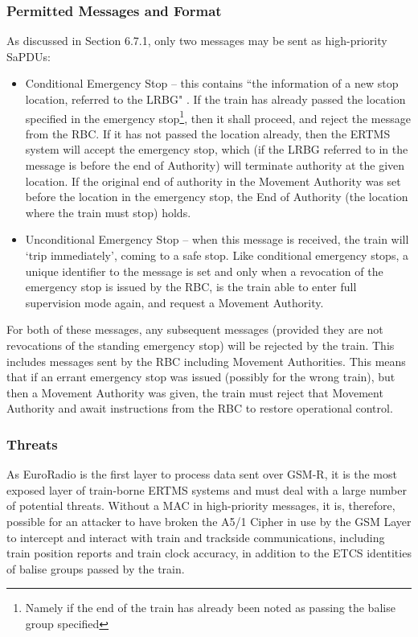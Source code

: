 \documentclass[twoside,11pt,a4paper]{article}
\begin{document}
\subsubsection{Permitted Messages and Format}
As discussed in Section 6.7.1, only two messages \citep[Section 8.5.3]{SUBSET-026-8} may be sent as high-priority SaPDUs:
\begin{itemize}[nolistsep]
\item Conditional Emergency Stop -- this contains ``the information of a new stop location, referred to the LRBG" \citep[Section 3.10.2]{SUBSET-026-3}. If the train has already passed the location specified in the emergency stop\footnote{Namely if the end of the train has already been noted as passing the balise group specified}, then it shall proceed, and reject the message from the RBC. If it has not passed the location already, then the ERTMS system will accept the emergency stop, which (if the LRBG referred to in the message is before the end of Authority) will terminate authority at the given location. If the original end of authority in the Movement Authority was set before the location in the emergency stop, the End of Authority (the location where the train must stop) holds.
\item Unconditional Emergency Stop -- when this message is received, the train will `trip immediately', coming to a safe stop. Like conditional emergency stops, a unique identifier to the message is set and only when a revocation of the emergency stop is issued by the RBC, is the train able to enter full supervision mode again, and request a Movement Authority. 
\end{itemize}
For both of these messages, any subsequent messages (provided they are not revocations of the standing emergency stop) will be rejected by the train. This includes messages sent by the RBC including Movement Authorities. This means that if an errant emergency stop was issued (possibly for the wrong train), but then a Movement Authority was given, the train must reject that Movement Authority and await instructions from the RBC to restore operational control.

\subsubsection{Threats}
As EuroRadio is the first layer to process data sent over GSM-R, it is the most exposed layer of train-borne ERTMS systems and must deal with a large number of potential threats. Without a MAC in high-priority messages, it is, therefore, possible for an attacker to have broken the A5/1 Cipher in use by the GSM Layer to intercept and interact with train and trackside communications, including train position reports and train clock accuracy, in addition to the ETCS identities of balise groups passed by the train.
\end{document}
